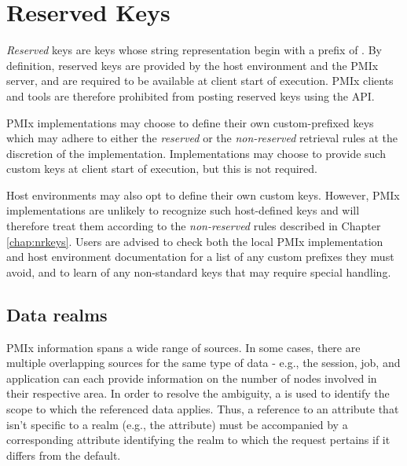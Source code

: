 \chapter{Reserved Keys}
\label{chap:api_rsvd_keys}


\emph{Reserved} keys are keys whose string representation begin with a prefix of
. By definition, reserved keys are provided by the host
environment and the \ac{PMIx} server, and are required to be available at client
start of execution. \ac{PMIx} clients and tools are therefore prohibited from
posting reserved keys using the  \ac{API}.

\ac{PMIx} implementations may choose to define their own
custom-prefixed keys which may adhere to either the \emph{reserved} or the \emph{non-reserved} retrieval rules at the discretion of the implementation. Implementations may choose to provide such custom keys at client start of execution, but this is not required.

Host environments may also opt to define their own custom keys. However, \ac{PMIx} implementations are unlikely to recognize such host-defined keys and will therefore treat them according to the \emph{non-reserved} rules described in Chapter \ref{chap:nrkeys}. Users
are advised to check both the local \ac{PMIx} implementation and host environment documentation
for a list of any custom prefixes they must avoid, and to learn of any non-standard keys that may require special handling.


\section{Data realms}
\label{api:struct:attributes:retrieval}

\ac{PMIx} information spans a wide range of sources. In some cases,
there are multiple overlapping sources for the same type of data - e.g., the
session, job, and application can each provide information on the number of
nodes involved in their respective area. In order to resolve the ambiguity,
a 
is used to identify the scope to which the referenced data applies. Thus, a reference
to an attribute that isn't specific to a realm (e.g., the
 attribute) must be accompanied by a corresponding
attribute identifying the realm to which the request pertains if it differs
from the default.

